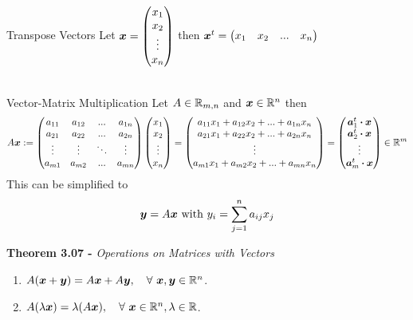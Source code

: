 \documentclass[11pt,a4paper]{article}
\begin{document}
\subtitle{Definition 3.05 - }{Transpose Vectors}
Let $\boldsymbol{x} = \begin{pmatrix} x_1 \\ x_2 \\ \vdots \\ x_n\end{pmatrix}$ then $\boldsymbol{x}^t = \begin{pmatrix} x_1 & x_2 & ... & x_n\end{pmatrix}$\\\\

\subtitle{Definition 3.06 - }{Vector-Matrix Multiplication}
Let $A \in \mathbb{R}_{m,n}$ and $\boldsymbol{x} \in \mathbb{R}^n$ then
$$A\boldsymbol{x} := \begin{pmatrix}
  a_{11} & a_{12} & ... & a_{1n} \\
  a_{21} & a_{22} & ... & a_{2n} \\
  \vdots & \vdots & \ddots & \vdots \\
  a_{m1} & a_{m2} & ... & a_{mn}
\end{pmatrix} \begin{pmatrix}
  x_1 \\ x_2 \\ \vdots \\ x_n
\end{pmatrix} = \begin{pmatrix}
  a_{11}x_1 + a_{12}x_2 + ... + a_{1n}{x_n} \\
  a_{21}x_1 + a_{22}x_2 + ... + a_{2n}{x_n} \\
  \vdots \\
  a_{m1}x_1 + a_{m2}x_2 + ... + a_{mn}{x_n} \\
\end{pmatrix} = \begin{pmatrix}
  \boldsymbol{a}_{1}^{t} \boldsymbol{\cdot} \boldsymbol{x} \\
  \boldsymbol{a}_{2}^{t} \boldsymbol{\cdot} \boldsymbol{x} \\
  \vdots \\
  \boldsymbol{a}_{m}^{t} \boldsymbol{\cdot} \boldsymbol{x} \\
\end{pmatrix} \in \mathbb{R}^m
$$ This can be simplified to $$\boldsymbol{y} = A\boldsymbol{x} \mathrm{\ with\ } y_i = \sum_{j=1}^n a_{ij} x_j$$

\textbf{Theorem 3.07 - }\textit{Operations on Matrices with Vectors}
\begin{enumerate}[label=\roman*)]
  \item $A(\boldsymbol{x} + \boldsymbol{y}) = A\boldsymbol{x} + A\boldsymbol{y},\quad \forall\ \boldsymbol{x}, \boldsymbol{y} \in \mathbb{R}^n$.
  \item $A(\lambda\boldsymbol{x}) = \lambda(A\boldsymbol{x}),\quad \forall\ \boldsymbol{x} \in \mathbb{R}^n, \lambda \in \mathbb{R}$.\\
\end{enumerate}
\end{document}
